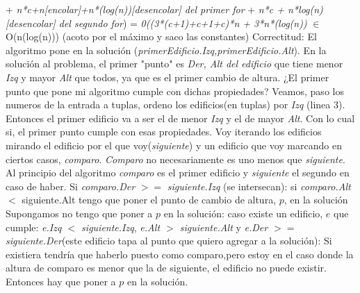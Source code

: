 \documentclass{article}
\begin{document}
+ \textit{n*c+n[\textit{encolar}]+n*(log(n))[\textit{desencolar}] del primer for} \newline
+ \textit{n*c + n*log(n)[\textit{desencolar}] del segundo for})  = \newline
\textit{0((3*(c+1)+c+1+c)*n + 3*n*(log(n))} \newline
$\in$ O(n(log(n))) (acoto por el máximo y saco las constantes)\newline
\newpage
{\noindent \Huge Correctitud:}
\newline \newline
El algoritmo pone en la solución (\textit{primerEdificio.Izq,primerEdificio.Alt}).\newline
En la solución al problema, el primer "punto" es \textit{Der, Alt del edificio} que tiene menor \textit{Izq} y mayor \textit{Alt} que todos, ya que es el primer cambio de altura.
¿El primer punto que pone mi algoritmo cumple con dichas propiedades?
Veamos, paso los numeros de la entrada a tuplas, ordeno los edificios(en tuplas) por \textit{Izq} (linea 3).
Entonces el primer edificio va a ser el de menor \textit{Izq} y el de mayor \textit{Alt}.\newline
Con lo cual si, el primer punto cumple con esas propiedades.
\newline
Voy iterando los edificios mirando el edificio por el que voy(\textit{siguiente}) y un edificio que voy marcando en ciertos casos, \textit{comparo}. \textit{Comparo} no necesariamente es uno menos que \textit{siguiente}.
Al principio del algoritmo \textit{comparo} es el primer edificio y \textit{siguiente} el segundo en caso de haber.\newline
Si \textit{comparo.Der} $>=$ \textit{siguiente.Izq} (se intersecan):\newline
si \textit{comparo.Alt} $<$ siguiente.Alt \newline
                tengo que poner el punto de cambio de altura, $p$, en la solución\newline
                Supongamos no tengo que poner a $p$ en la solución:\newline
                        caso existe un edificio, $e$ que cumple: \textit{e.Izq $<$ siguiente.Izq}, \textit{e.Alt $>$ siguiente.Alt} y \textit{e.Der $>=$ siguiente.Der}(este edificio tapa al punto que quiero agregar a la solución):\newline
\color{red}{(ejemplo grafico C)} \color{black} \newline
                        Si existiera tendría que haberlo puesto como comparo,pero estoy en el caso donde la altura de comparo es menor que la de siguiente, el edificio no puede existir. Entonces hay que poner a $p$ en la solución.\newline
\end{document}
